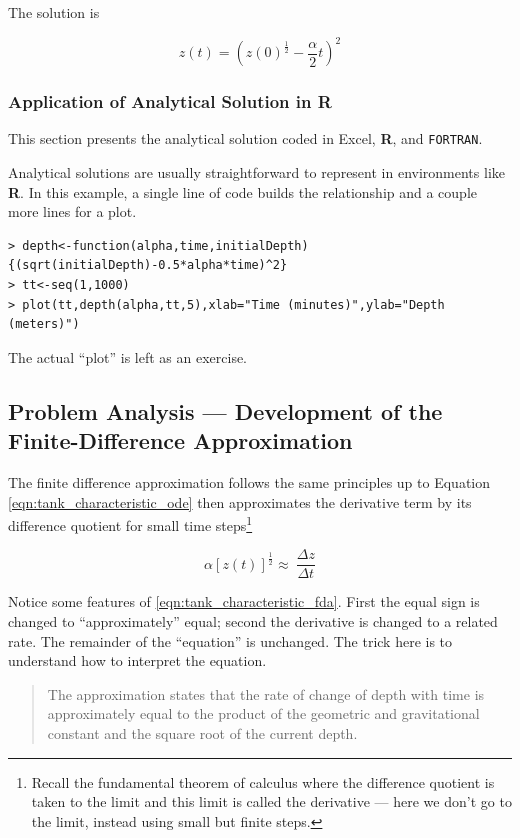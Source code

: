 The solution is

\begin{equation}
z(t)=(z(0)^{\frac{1}{2}}-\frac{\alpha}{2}t)^2
\label{eqn:tank_characteristic_solution}
\end{equation}

\subsubsection{Application of Analytical Solution in \textbf{R}}
This section presents the analytical solution coded in Excel, \textbf{R}, and \texttt{FORTRAN}.  


Analytical solutions are usually straightforward to represent in environments like \textbf{R}.  In this example, a single line of code builds the relationship and a couple more lines for a plot.

\begin{verbatim}
> depth<-function(alpha,time,initialDepth){(sqrt(initialDepth)-0.5*alpha*time)^2}
> tt<-seq(1,1000)
> plot(tt,depth(alpha,tt,5),xlab="Time (minutes)",ylab="Depth (meters)")
\end{verbatim}

The actual ``plot'' is left as an exercise. 

\subsection{Problem Analysis --- Development of the Finite-Difference Approximation}
The finite difference approximation follows the same principles up to Equation \ref{eqn:tank_characteristic_ode} then approximates the derivative term by its difference quotient for small time steps\footnote{Recall the fundamental theorem of calculus where the difference quotient is taken to the limit and this limit is called the derivative --- here we don't go to the limit, instead using small but finite steps.}

\begin{equation}
\alpha  [z(t)]^{\frac{1}{2}}\approx~  \frac{\Delta z}{\Delta t}
\label{eqn:tank_characteristic_fda}
\end{equation}

Notice some features of \ref{eqn:tank_characteristic_fda}.  First the equal sign is changed to ``approximately'' equal; second the derivative is changed to a related rate.  The remainder of the ``equation'' is unchanged.  The trick here is to understand how to interpret the equation. 
\begin{quote}
The approximation states that the rate of change of depth with time is approximately equal to the product of the geometric and gravitational constant and the square root of the current depth. 
\end{quote}

